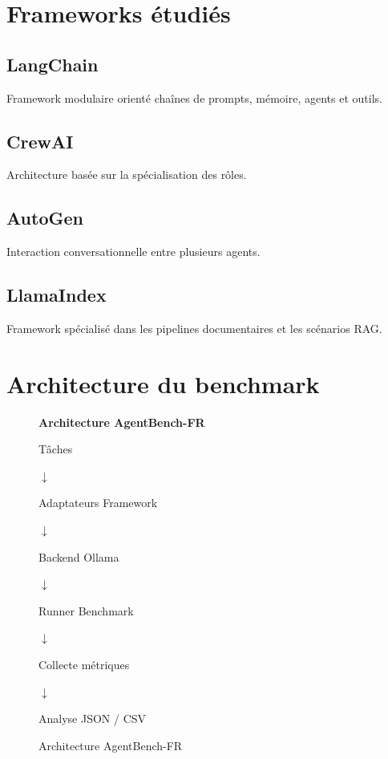 \documentclass[12pt,a4paper]{article}
\renewcommand{\placeholderfig}[2]{
\begin{figure}[H]
\centering
\begin{tcolorbox}[
  colback=white,
  colframe=secondary,
  boxrule=1pt,
  arc=3mm,
  width=0.85\textwidth,
  halign=center,
  valign=center,
  drop fuzzy shadow
]
\vspace{0.5cm}
\textbf{\Large\textcolor{primary}{#1}}
\vspace{0.8cm}\\
{\linespread{1.5}\selectfont #2 \par}
\vspace{0.5cm}
\end{tcolorbox}
\caption{#1}
\end{figure}
}
\begin{document}

\section{Frameworks étudiés}

\subsection{LangChain}

Framework modulaire
orienté chaînes de prompts,
mémoire,
agents
et outils.

\subsection{CrewAI}

Architecture basée sur
la spécialisation des rôles.

\subsection{AutoGen}

Interaction conversationnelle
entre plusieurs agents.

\subsection{LlamaIndex}

Framework spécialisé
dans les pipelines documentaires
et les scénarios RAG.


\section{Architecture du benchmark}

\placeholderfig
{Architecture AgentBench-FR}
{
Tâches

$\downarrow$

Adaptateurs Framework

$\downarrow$

Backend Ollama

$\downarrow$

Runner Benchmark

$\downarrow$

Collecte métriques

$\downarrow$

Analyse JSON / CSV
}
\end{document}
